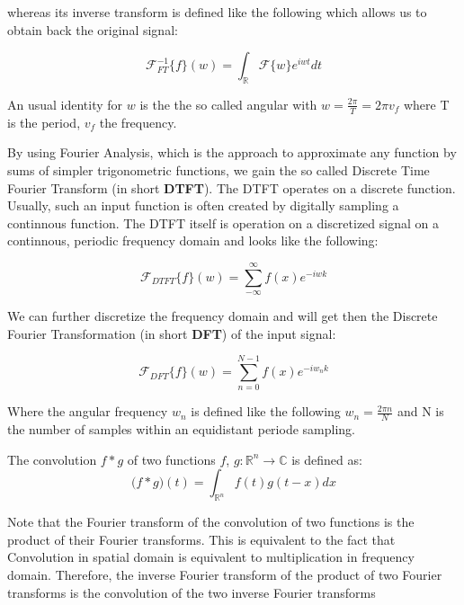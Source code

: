 whereas its inverse transform is defined like the following which allows us to obtain back the original signal:

\begin{equation}
  \mathcal{F}_{FT}^{-1}\{f\}(w) = \int_{\mathds{R}} \mathcal{F}\{w\}e^{iwt} dt
\end{equation}

An usual identity for $w$ is the the so called angular with $w = \frac{2 \pi}{T} = 2 \pi v_f$ where T is the period, $v_f$ the frequency.

By using Fourier Analysis, which is the approach to approximate any function by sums of simpler trigonometric functions, we gain the so called Discrete Time Fourier Transform (in short \textbf{DTFT}). The DTFT operates on a discrete function. Usually, such an input function is often created by digitally sampling a continnous function. The DTFT itself is operation on a discretized signal on a continnous, periodic frequency domain and looks like the following:

\begin{equation}
  \mathcal{F}_{DTFT}\{f\}(w) = \sum_{-\infty}^{\infty} f(x) e^{-iwk}
\end{equation}

We can further discretize the frequency domain and will get then the Discrete Fourier Transformation (in short \textbf{DFT}) of the input signal:

\begin{equation}
  \mathcal{F}_{DFT}\{f\}(w) = \sum_{n=0}^{N-1} f(x) e^{-iw_{n}k}
\end{equation}

Where the angular frequency $w_n$ is defined like the following $w_n = \frac{2\pi n}{N}$ and N is the number of samples within an equidistant periode sampling.

The convolution $f*g$ of two functions $f$, $g$$\colon \mathds{R}^n \to \mathds{C} $ is defined as:  
\begin{equation}
  \mathcal (f*g)(t) = \int_{\mathds{R}^n} f(t)g(t-x) dx
\end{equation}

Note that the Fourier transform of the convolution of two functions is the product of their Fourier transforms. This is equivalent to the fact that Convolution in spatial domain is equivalent to multiplication in frequency domain. Therefore, the inverse Fourier transform of the product of two Fourier transforms is the convolution of the two inverse Fourier transforms

